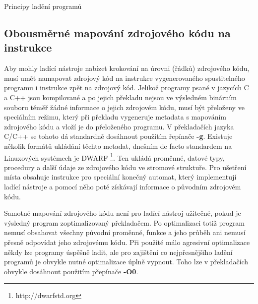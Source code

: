 \documentclass[bc,male,python,dept460]{diploma}						%
\newcommand{\parspace}[1][]{
	\ifthenelse{\isempty{#1}}{\vspace{5mm}}{\vspace{#1}}
	\par
}
\begin{document}
\begin{section}{Principy ladění programů}
	\subsection{Obousměrné mapování zdrojového kódu na instrukce}
		Aby mohly ladící nástroje nabízet krokování na úrovni (řádků) zdrojového kódu, musí umět namapovat zdrojový kód na instrukce vygenerovaného
		spustitelného programu i instrukce zpět na zdrojový kód. Jelikož programy psané v jazycích C a C++ jsou kompilované a po jejich překladu nejsou
		ve výsledném binárním souboru téměř žádné informace o jejich zdrojovém kódu, musí být přeloženy ve speciálním režimu, který při překladu vygeneruje
		metadata s mapováním zdrojového kódu a vloží je do přeloženého programu. V překladačích jazyka C/C++ se tohoto dá standardně dosáhnout použitím
		řepínače \textbf{-g}. Existuje několik formátů ukládání těchto metadat, dnešním de facto standardem na Linuxových systémech je DWARF
		\footnote{http://dwarfstd.org}. Ten ukládá proměnné, datové typy, procedury a další údaje ze zdrojového kódu ve stromové struktuře.
		Pro ušetření místa obsahuje instrukce pro speciální konečný automat, který implementují ladící nástroje a pomocí něho poté získávají
		informace o původním zdrojovém kódu.
		
		\parspace Samotné mapování zdrojového kódu není pro ladící nástroj užitečné, pokud je výsledný program zoptimalizovaný překladačem. Po optimalizaci
		totiž program nemusí obsahovat všechny původní proměnné, funkce a jeho průběh ani nemusí přesně odpovídat jeho zdrojovému kódu. Při použité málo agresivní
		optimalizace někdy lze programy úspěšně ladit, ale pro zajištění co nejpřesnějšího ladění programů je obvykle nutné optimalizace úplně vypnout. Toho lze
		v překladačích obvykle dosáhnout použitím přepínače \textbf{-O0}.
	

\end{section}
\end{document}
